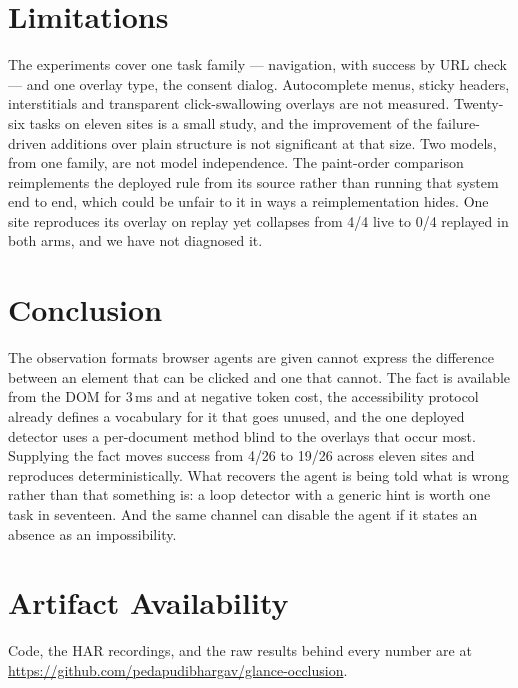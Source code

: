 \documentclass[conference]{IEEEtran}
\begin{document}
\section{Limitations}
\label{sec:limits}

The experiments cover one task family --- navigation, with success by URL check
--- and one overlay type, the consent dialog. Autocomplete menus, sticky
headers, interstitials and transparent click-swallowing overlays are not
measured. Twenty-six tasks on eleven sites is a small study, and the
improvement of the failure-driven additions over plain structure is not
significant at that size. Two models, from one family, are not model
independence. The paint-order comparison reimplements the deployed rule from its
source rather than running that system end to end, which could be unfair to it
in ways a reimplementation hides. One site reproduces its overlay on replay yet
collapses from 4/4 live to 0/4 replayed in both arms, and we have not diagnosed
it.

\section{Conclusion}

The observation formats browser agents are given cannot express the difference
between an element that can be clicked and one that cannot. The fact is
available from the DOM for 3\,ms and at negative token cost, the accessibility
protocol already defines a vocabulary for it that goes unused, and the one
deployed detector uses a per-document method blind to the overlays that occur
most. Supplying the fact moves success from 4/26 to 19/26 across eleven sites
and reproduces deterministically. What recovers the agent is being told what is
wrong rather than that something is: a loop detector with a generic hint is
worth one task in seventeen. And the same channel can disable the agent if it
states an absence as an impossibility.

\section*{Artifact Availability}

Code, the HAR recordings, and the raw results behind every number are at
\url{https://github.com/pedapudibhargav/glance-occlusion}.
\end{document}
